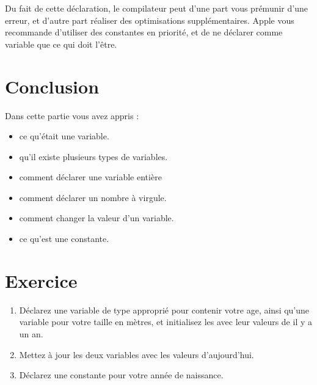 Du fait de cette déclaration, le compilateur peut d'une part vous prémunir d'une erreur, et
d'autre part réaliser des optimisations supplémentaires. Apple vous recommande d'utiliser
des constantes en priorité, et de ne déclarer comme variable que ce qui doit l'être.
\section*{Conclusion}
{}
Dans cette partie vous avez appris :
\begin{itemize}
\item ce qu'était une variable.
\item qu'il existe plusieurs types de variables.
\item comment déclarer une variable entière
\item comment déclarer un nombre à virgule.
\item comment changer la valeur d'un variable.
\item ce qu'est une constante.
\end{itemize}

\section*{Exercice}
{}
\begin{enumerate}
\item Déclarez une variable de type approprié pour contenir votre age, ainsi qu'une variable pour votre taille en mètres, et initialisez les avec leur valeurs de il y a un an.
\item Mettez à jour les deux variables avec les valeurs d'aujourd'hui.
\item Déclarez une constante pour votre année de naissance.
\end{enumerate}
